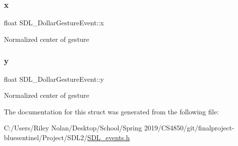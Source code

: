 \subsubsection{\texorpdfstring{x}{x}}
{\footnotesize\ttfamily float S\+D\+L\+\_\+\+Dollar\+Gesture\+Event\+::x}

Normalized center of gesture \mbox{\label{struct_s_d_l___dollar_gesture_event_a293b2303acc1cfc63c167c5525e6eab5}} 
\subsubsection{\texorpdfstring{y}{y}}
{\footnotesize\ttfamily float S\+D\+L\+\_\+\+Dollar\+Gesture\+Event\+::y}

Normalized center of gesture 

The documentation for this struct was generated from the following file\+:\begin{DoxyCompactItemize}
\item 
C\+:/\+Users/\+Riley Nolan/\+Desktop/\+School/\+Spring 2019/\+C\+S4850/git/finalproject-\/bluesentinel/\+Project/\+S\+D\+L2/\mbox{\hyperlink{_s_d_l__events_8h}{S\+D\+L\+\_\+events.\+h}}\end{DoxyCompactItemize}
